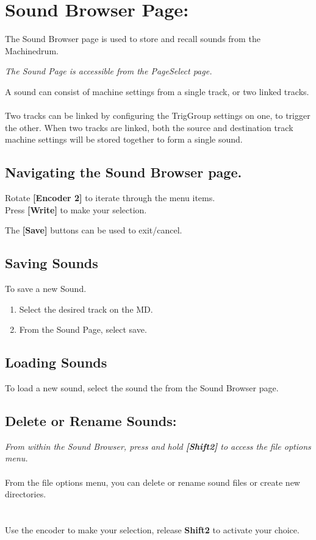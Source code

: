 \chapter{Sound Browser Page:}
The Sound Browser page is used to store and recall sounds from the Machinedrum.

 \textit{The Sound Page is accessible from the PageSelect page.}


A sound can consist of machine settings from a single track, or two linked tracks.\\
\\
Two tracks can be linked by configuring the TrigGroup settings on one, to trigger the other. When two tracks are linked, both the source and destination track machine settings will be stored together to form a single sound.


 \section{Navigating the Sound Browser page.}
Rotate \textbf{[Encoder 2]} to iterate through the menu items.\\
Press \textbf{[Write]} to make your selection.

The \textbf{[Save]} buttons can be used to exit/cancel.
 
 \section{Saving Sounds}
 To save a new Sound. 
\begin{enumerate}
 \item Select the desired track on the MD.
 \item From the Sound Page, select save.
\end{enumerate}
\section{Loading Sounds}
To load a new sound, select the sound the from the Sound Browser page.
\newpage
\section{Delete or Rename Sounds:}
\textit{From within the Sound Browser, press and hold \textbf{[Shift2]} to access the file options menu.}\\\\
From the file options menu, you can delete or rename sound files or create new directories.\\\\\\
Use the encoder to make your selection, release \textbf{Shift2} to activate your choice.
